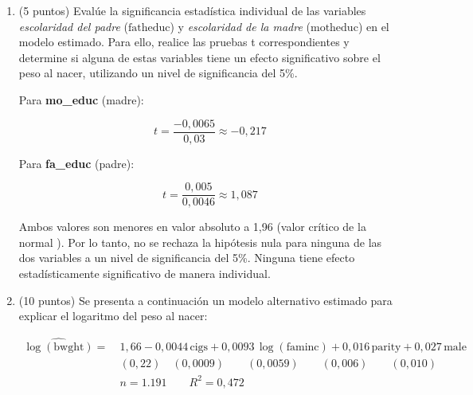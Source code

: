 \documentclass[10pt,a4paper]{article}
\begin{document}
\begin{enumerate}
\begin{enumerate}
{\[
0{,}011 \times 10 = 0{,}11\%
\]

Este término puede interpretarse como una elasticidad al estar ambas variables medidas en logaritmos.

Para evaluar la significancia estadística:

\[
t = \frac{0{,}011}{0{,}004} = 2{,}75
\]

Como tenemos gl=1191-7= 1184 usamos el valor cr\'itico de la normal. El valor del estad\'istico supera el valor crítico de 2{,}576  para \(\alpha = 0{,}01\), por lo que se concluye que el ingreso familiar tiene un efecto estadísticamente significativo sobre el peso al nacer al 1\%.
}

    \item (5 puntos) Evalúe la significancia estadística individual de las variables \textit{escolaridad del padre} (\( \text{fatheduc} \)) y \textit{escolaridad de la madre} (\( \text{motheduc} \)) en el modelo estimado. Para ello, realice las pruebas t correspondientes y determine si alguna de estas variables tiene un efecto significativo sobre el peso al nacer, utilizando un nivel de significancia del 5\%.

    {\color{blue}Para \textbf{mo\_educ} (madre):

\[
t = \frac{-0{,}0065}{0{,}03} \approx -0{,}217
\]

Para \textbf{fa\_educ} (padre):

\[
t = \frac{0{,}005}{0{,}0046} \approx 1{,}087
\]

Ambos valores son menores en valor absoluto a 1,96 (valor crítico de la normal ).
Por lo tanto, no se rechaza la hipótesis nula para ninguna de las dos variables a un nivel de significancia del 5\%. Ninguna tiene efecto estadísticamente significativo de manera individual.
}

    \item {(10 puntos)} Se presenta a continuación un modelo alternativo estimado para explicar el logaritmo del peso al nacer:

    \begin{equation*}
    \begin{aligned}
    \widehat{\log(\text{bwght})} =\ & 1{,}66 - 0{,}0044\, \text{cigs} + 0{,}0093\, \log(\text{faminc}) + 0{,}016\, \text{parity} + 0{,}027\, \text{male} \\
    & (0{,}22) \quad (0{,}0009) \quad \quad (0{,}0059) \quad \quad (0{,}006) \quad \quad (0{,}010) \\
    & n = 1.191 \quad \quad R^2 = 0{,}472
    \end{aligned}
    \end{equation*}


\end{enumerate}
\end{enumerate}
\end{document}

